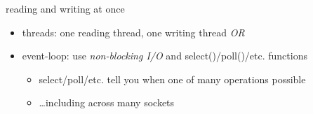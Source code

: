 \begin{frame}{reading and writing at once}
    \begin{itemize}
    \item threads: one reading thread, one writing thread \textit{OR}
    \item event-loop: use \textit{non-blocking I/O} and select()/poll()/etc. functions
        \begin{itemize}
        \item select/poll/etc. tell you when one of many operations possible
        \item \ldots including across many sockets
        \end{itemize}
    \end{itemize}
\end{frame}
